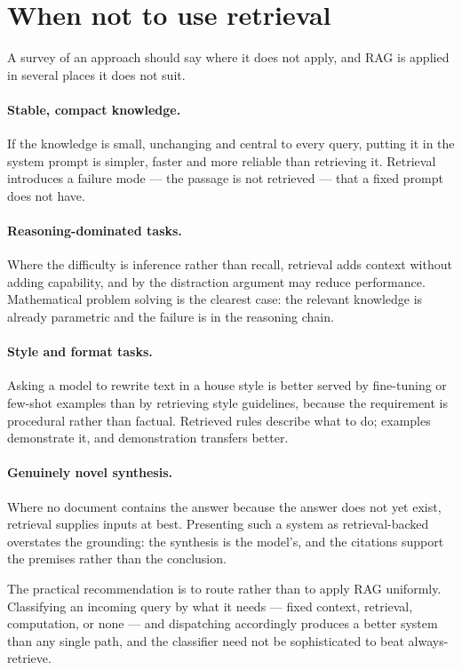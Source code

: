 \documentclass[11pt,a4paper]{article}
\begin{document}
\section{When not to use retrieval}
\label{sec:whennot}

A survey of an approach should say where it does not apply, and RAG is applied
in several places it does not suit.

\paragraph{Stable, compact knowledge.}
If the knowledge is small, unchanging and central to every query, putting it in
the system prompt is simpler, faster and more reliable than retrieving it.
Retrieval introduces a failure mode --- the passage is not retrieved --- that
a fixed prompt does not have.

\paragraph{Reasoning-dominated tasks.}
Where the difficulty is inference rather than recall, retrieval adds context
without adding capability, and by the distraction argument may reduce
performance. Mathematical problem solving is the clearest case: the relevant
knowledge is already parametric and the failure is in the reasoning chain.

\paragraph{Style and format tasks.}
Asking a model to rewrite text in a house style is better served by
fine-tuning or few-shot examples than by retrieving style guidelines, because
the requirement is procedural rather than factual. Retrieved rules describe
what to do; examples demonstrate it, and demonstration transfers better.

\paragraph{Genuinely novel synthesis.}
Where no document contains the answer because the answer does not yet exist,
retrieval supplies inputs at best. Presenting such a system as retrieval-backed
overstates the grounding: the synthesis is the model's, and the citations
support the premises rather than the conclusion.

The practical recommendation is to route rather than to apply RAG uniformly.
Classifying an incoming query by what it needs --- fixed context, retrieval,
computation, or none --- and dispatching accordingly produces a better system
than any single path, and the classifier need not be sophisticated to beat
always-retrieve.
\end{document}

